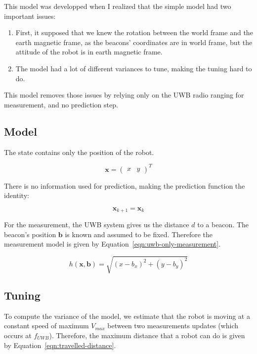 \documentclass[a4paper, 12pt]{scrreprt}
\begin{document}
This model was developped when I realized that the simple model had two important issues:

\begin{enumerate}
\item First, it supposed that we knew the rotation between the world frame and the earth magnetic frame, as the beacons' coordinates are in world frame, but the attitude of the robot is in earth magnetic frame.
\item The model had a lot of different variances to tune, making the tuning hard to do.
\end{enumerate}

This model removes those issues by relying only on the UWB radio ranging for measurement, and no prediction step.

\subsection{Model}

The state contains only the position of the robot.

\begin{equation*}
\mathbf{x} = \begin{pmatrix}x & y\end{pmatrix}^T
\end{equation*}


There is no information used for prediction, making the prediction function the identity:

\begin{equation}
\mathbf{x}_{k+1} = \mathbf{x}_{k}
\end{equation}

For the measurement, the UWB system gives us the distance $d$ to a beacon. The beacon's position $\mathbf{b}$ is known and assumed to be fixed.
Therefore the measurement model is given by Equation~\ref{eqn:uwb-only-measurement}.

\begin{equation}
h(\mathbf{x}, \mathbf{b}) = \sqrt{\left(x - b_x\right)^2 + \left(y - b_y\right)^2}
\label{eqn:uwb-only-measurement}
\end{equation}

\subsection{Tuning}

To compute the variance of the model, we estimate that the robot is moving at a constant speed of maximum $V_{max}$ between two measurements updates (which occurs at \(f_{UWB}\)).
Therefore, the maximum distance that a robot can do is given by Equation~\ref{eqn:travelled-distance}.
\end{document}
